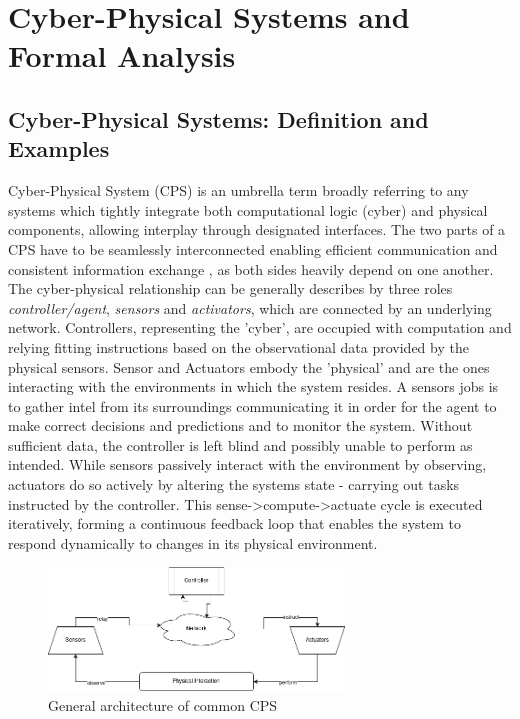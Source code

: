 \chapter{Cyber-Physical Systems and Formal Analysis}

\section{Cyber-Physical Systems: Definition and Examples}

Cyber-Physical System (CPS) is an umbrella term broadly referring to any systems which tightly integrate both computational logic (cyber) and physical components, allowing interplay
through designated interfaces. \cite{cpsModelDesc} The two parts of a CPS have to be seamlessly interconnected enabling efficient communication and consistent information
exchange \cite{cpsChallengesAndFuture}, as both sides heavily depend on one another.
The cyber-physical relationship can be generally describes by three roles \textit{controller/agent}, \textit{sensors} and \textit{activators},
which are connected by an underlying network.
Controllers, representing the 'cyber', are occupied with computation and relying fitting instructions based on the observational data provided by the physical sensors.
Sensor and Actuators embody the 'physical' and are the ones interacting with the environments in which the system resides. A sensors jobs is to gather intel from its
surroundings communicating it in order for the agent to make correct decisions and predictions and to monitor the system. Without sufficient data, the controller is left
blind and possibly  unable to perform as intended. While sensors passively interact with the environment by observing, actuators do so actively by altering the systems state
- carrying out tasks instructed by the controller. This sense->compute->actuate cycle is executed iteratively, forming a continuous feedback loop that enables the system to
respond dynamically to changes in its physical environment.

\begin{figure}[htbp]
  \centering
  \includegraphics[width=0.7\textwidth]{graphics/cpsGeneralArchitecture.png}
  \caption{General architecture of common CPS}
  \label{fig:cps_architecture}
\end{figure}


